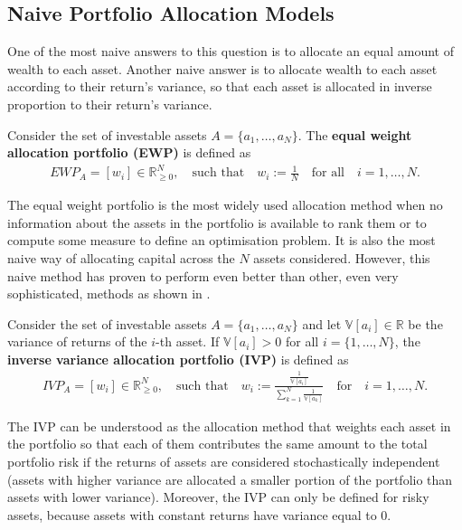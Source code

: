 \subsection{Naive Portfolio Allocation Models}
    One of the most naive answers to this question is to allocate an equal amount of wealth to each asset. Another naive answer is to allocate wealth to each asset according to their return's variance, so that each asset is allocated in inverse proportion to their return's variance.
    
    \begin{definition}\label{definition:EqualWeightPortfolio}
        Consider the set of investable assets $A = \{ a_1, \dots, a_N \}$. The \textbf{equal weight allocation portfolio (EWP)} is defined as
        \begin{align*}
            EWP_A = [w_i] \in \mathbb{R}_{\geq 0}^N, \quad \text{such that} \quad w_i := \frac{1}{N} \quad \text{for all} \quad i = 1, \dots, N.
        \end{align*}
    \end{definition}
    
    The equal weight portfolio is the most widely used allocation method when no information about the assets in the portfolio is available to rank them or to compute some measure to define an optimisation problem. It is also the most naive way of allocating capital across the $N$ assets considered. However, this naive method has proven to perform even better than other, even very sophisticated, methods as shown in \cite{equalweight}.
    
    \begin{definition}\label{definition:InverseVariancePortfolio}
       Consider the set of investable assets $A = \{ a_1, \dots, a_N \}$ and let $\mathbb{V}[a_i] \in \mathbb{R}$ be the variance of returns of the $i$-th asset. If $\mathbb{V}[a_i] > 0$ for all $i=\{ 1, \dots, N \}$, the \textbf{inverse variance allocation portfolio (IVP)} is defined as
        \begin{align*}
            IVP_A = [w_i] \in \mathbb{R}_{\geq 0}^N, \quad \text{such that} \quad w_i := \frac{\frac{1}{\mathbb{V}[a_i]}}{\sum_{k=1}^N \frac{1}{\mathbb{V}[a_k]}} \quad \text{for} \quad i=1, \dots, N.
        \end{align*}
    \end{definition}
    
    The IVP can be understood as the allocation method that weights each asset in the portfolio so that each of them contributes the same amount to the total portfolio risk if the returns of assets are considered stochastically independent (assets with higher variance are allocated a smaller portion of the portfolio than assets with lower variance). Moreover, the IVP can only be defined for risky assets, because assets with constant returns have variance equal to $0$.
    
